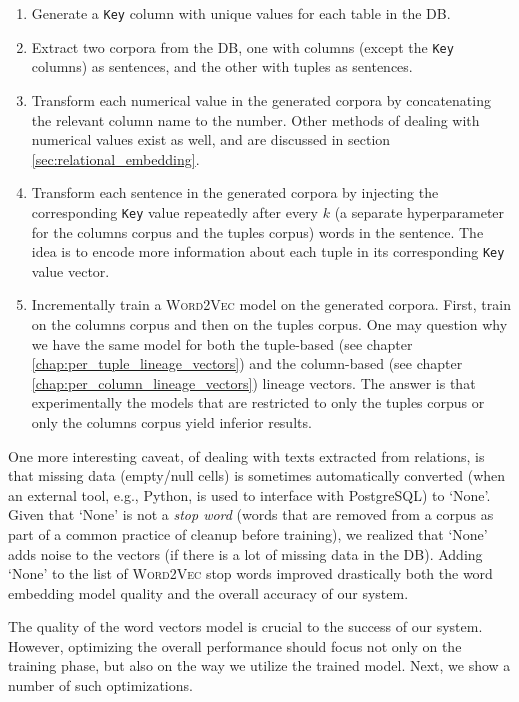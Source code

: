 \begin{enumerate}
    \item Generate a \texttt{Key} column with unique values for each table in the DB.
    \item Extract two corpora from the DB, one with columns (except the \texttt{Key} columns) as sentences, and the other with tuples as sentences.
    \item Transform each numerical value in the generated corpora by concatenating the relevant column name to the number. Other methods of dealing with numerical values exist as well, and are discussed in section \ref{sec:relational_embedding}.
    \item Transform each sentence in the generated corpora by injecting the corresponding \texttt{Key} value repeatedly after every $k$ (a separate hyperparameter for the columns corpus and the tuples corpus) words in the sentence. The idea is to encode more information about each tuple in its corresponding \texttt{Key} value vector.
    \item Incrementally train a \textsc{Word2Vec} model on the generated corpora. First, train on the columns corpus and then on the tuples corpus. One may question why we have the same model for both the tuple-based (see chapter \ref{chap:per_tuple_lineage_vectors}) and the column-based (see chapter \ref{chap:per_column_lineage_vectors}) lineage vectors. The answer is that experimentally the models that are restricted to only the tuples corpus or only the columns corpus yield inferior results.
\end{enumerate}
One more interesting caveat, of dealing with texts extracted from relations, is that missing data (empty/null cells) is sometimes automatically converted (when an external tool, e.g., Python, is used to interface with PostgreSQL) to `None'. Given that `None' is not a \textit{stop word} (words that are removed from a corpus as part of a common practice of cleanup before training), we realized that `None' adds noise to the vectors (if there is a lot of missing data in the DB). Adding `None' to the list of \textsc{Word2Vec} stop words improved drastically both the word embedding model quality and the overall accuracy of our system. \\

\par The quality of the word vectors model is crucial to the success of our system. However, optimizing the overall performance should focus not only on the training phase, but also on the way we utilize the trained model. Next, we show a number of such optimizations.\\
